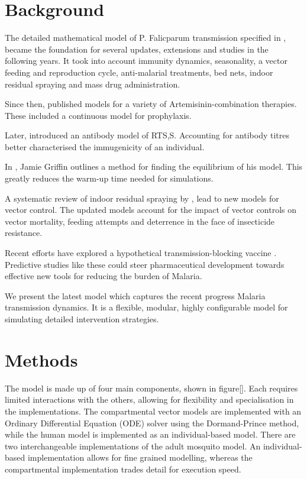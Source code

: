 \documentclass{bmcart}
\begin{document}
\section*{Background}

The detailed mathematical model of P. Falicparum transmission specified in \cite{griffin_reducing_2010}, became the foundation for several updates, extensions and studies in the following years. It took into account immunity dynamics, seasonality, a vector feeding and reproduction cycle, anti-malarial treatments, bed nets, indoor residual spraying and mass drug administration.

Since then, \cite{okell_contrasting_2014} published models for a variety of Artemisinin-combination therapies. These included a continuous model for prophylaxis.

Later, \cite{white_immunogenicity_2015} introduced an antibody model of RTS,S. Accounting for antibody titres better characterised the immugenicity of an individual.

In \cite{griffin_is_2016}, Jamie Griffin outlines a method for finding the equilibrium of his model. This greatly reduces the warm-up time needed for simulations. 

A systematic review of indoor residual spraying by \cite{sherrard-smith_systematic_2018}, lead to new models for vector control. The updated models account for the impact of vector controls on vector mortality, feeding attempts and deterrence in the face of insecticide resistance.

Recent efforts have explored a hypothetical transmission-blocking vaccine \cite{challenger_predicting_2021}. Predictive studies like these could steer pharmaceutical development towards effective new tools for reducing the burden of Malaria.

We present the latest model which captures the recent progress Malaria transmission dynamics. It is a flexible, modular, highly configurable model for simulating detailed intervention strategies.

\section*{Methods}

The model is made up of four main components, shown in figure[]. Each requires limited interactions with the others, allowing for flexibility and specialisation in the implementations. The compartmental vector models are implemented with an Ordinary Differential Equation (ODE) solver using the Dormand-Prince method, while the human model is implemented as an individual-based model. There are two interchangeable implementations of the adult mosquito model. An individual-based implementation allows for fine grained modelling, whereas the compartmental implementation trades detail for execution speed.
\end{document}
